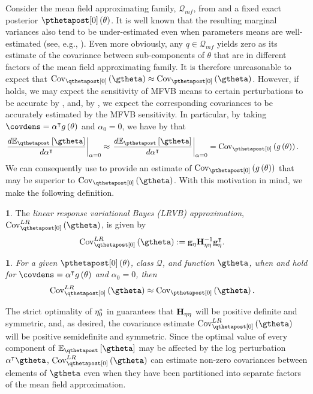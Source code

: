 \documentclass{article}\usepackage[]{graphicx}\usepackage[]{color}
\theoremstyle{definition}
\newtheorem{defn}{\protect\definitionname}
\theoremstyle{plain}
\theoremstyle{plain}
\theoremstyle{plain}
\newtheorem{cor}{\protect\corollaryname}
\theoremstyle{definition}
\theoremstyle{plain}
\theoremstyle{plain}
\providecommand{\corollaryname}{Corollary}
\providecommand{\definitionname}{Definition}
\begin{document}
Consider the mean field approximating family, $\mathcal{Q}_{mf}$,
from  and a fixed exact posterior
$\pzeropost\left(\theta\right)$. It is well known that the resulting
marginal variances also tend to be under-estimated even when
parameters means are well-estimated
(see, e.g., \citep[Chapter 10]{mackay:2003:information,wang:2005:inadequacy,turner:2011:two,bishop:2006:pattern}).
Even more obviously, any $q\in\mathcal{Q}_{mf}$ yields zero as its estimate of
the covariance between sub-components of $\theta$ that are in different
factors of the mean field approximating family. It is therefore unreasonable
to expect that $\qcov\left(\gtheta\right)\approx\pcov\left(\gtheta\right)$.
However, if  holds, we may expect the
sensitivity of MFVB means to certain perturbations to be accurate by
, and, by ,
we expect the corresponding covariances to be accurately estimated
by the MFVB sensitivity. In particular, by taking
$\covdens=\alpha^{\trans}g\left(\theta\right)$
and $\alpha_{0}=0$, we
have by  that
\begin{align}
\left.\frac{d\mbe_{\qthetapost}\left[\gtheta\right]}{d\alpha^{\trans}}\right|_{\alpha=0} &
    \approx\left.\frac{d\mbe_{\pthetapost}\left[\gtheta\right]}
    {d\alpha^{\trans}}\right|_{\alpha=0}=\pcov\left(g\left(\theta\right)\right).
    \label{eq:sensitivity_is_cov}
\end{align}
We can consequently use  to provide an
estimate of $\pcov\left(g\left(\theta\right)\right)$ that may be
superior to $\qcov\left(\gtheta\right)$. With this motivation in
mind, we make the following definition.
\begin{defn}
\label{def:lrvb_covariance}The \textit{linear response variational
Bayes (LRVB) approximation}, $\lrvbcov\left(\gtheta\right)$, is given
by
\begin{align}
\lrvbcov\left(\gtheta\right) & :=\eggrad\klhess^{-1}\eggrad^{\trans}.
\label{eq:lrvb_for_covariance}
\end{align}
\end{defn}
\begin{cor}
\label{cor:lrvb_accurate}For a given $\pzeropost\left(\theta\right)$,
class $\mathcal{Q}$, and function $\gtheta$, when \vbassum and
 hold for $\covdens=\alpha^{\trans}g\left(\theta\right)$
and $\alpha_{0}=0$, then
\begin{align*}
\lrvbcov\left(\gtheta\right) & \approx\pcov\left(\gtheta\right).
\end{align*}
\end{cor}
The strict optimality of $\eta_{0}^{*}$ in 
guarantees that $\mathbf{H}_{\eta\eta}$ will be positive definite and symmetric,
and, as desired, the covariance estimate $\lrvbcov\left(\gtheta\right)$
will be positive semidefinite and symmetric. Since the optimal value
of every component of $\mbe_{\qthetapost}\left[\gtheta\right]$ may
be affected by the log perturbation $\alpha^{\trans}\gtheta$, $\lrvbcov\left(\gtheta\right)$
can estimate non-zero covariances between elements of $\gtheta$ even
when they have been partitioned into separate factors of the mean
field approximation.
\end{document}

